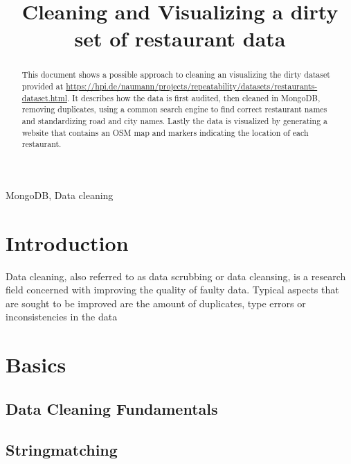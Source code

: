 \documentclass[conference]{IEEEtran}
\begin{document}
\title{Cleaning and Visualizing a dirty set of restaurant data}


\author{
}

\maketitle

\begin{abstract}
This document shows a possible approach to cleaning an visualizing the dirty dataset provided at \url{https://hpi.de/naumann/projects/repeatability/datasets/restaurants-dataset.html}. It describes how the data is first audited, then cleaned in MongoDB, removing duplicates, using a common search engine to find correct restaurant names and standardizing road and city names. Lastly the data is visualized by generating a website that contains an OSM map and markers indicating the location of each restaurant.
\end{abstract}

\begin{IEEEkeywords}
MongoDB, Data cleaning
\end{IEEEkeywords}

\section{Introduction}
Data cleaning, also referred to as data scrubbing or data cleansing, is a research field concerned with improving the quality of faulty data. Typical aspects that are sought to be improved are the amount of duplicates, type errors or inconsistencies in the data\cite{Bilenko.2003}

\section{Basics}
\subsection{Data Cleaning Fundamentals}
\subsection{Stringmatching}


\printbibliography
\end{document}
